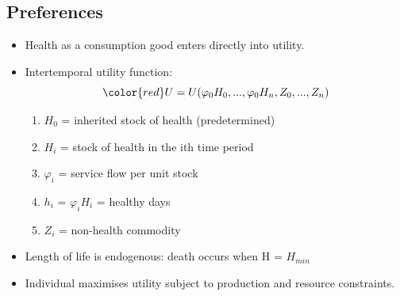 \subsection{Preferences}
\begin{itemize}
        \item Health as a consumption good enters directly into utility.
        \item Intertemporal utility function: $$\color{red} U = U(\varphi_0 H_0,...,\varphi_0 H_n,Z_0,...,Z_n)$$  
        \begin{enumerate} 
        \item $H_0$ = inherited stock of health (predetermined)
        \item $H_i$ = stock of health in the ith time period
        \item $\varphi_i$ = service flow per unit stock
        \item $h_i$ = $\varphi_iH_i$ = healthy days
        \item $Z_i$ = non-health commodity
        \end{enumerate}
        \item Length of life is endogenous: death occurs when H = $H_{min}$
        \item Individual maximises utility subject to production and resource constraints.
\end{itemize}

